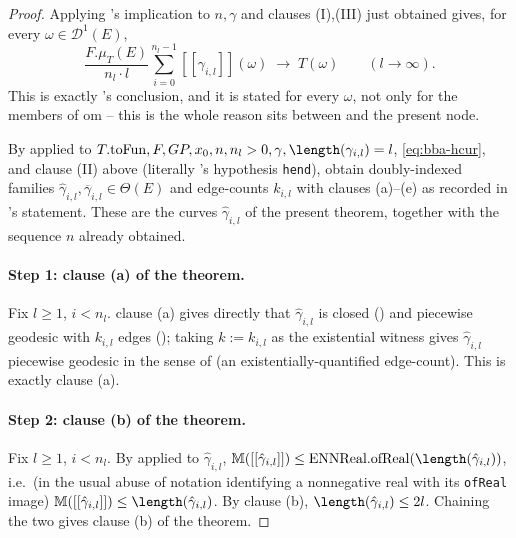\begin{proof}
  Applying 's implication to $n,\gamma$ and clauses (I),(III) just
  obtained gives, for every $\omega\in\mathcal D^1(E)$,
  \begin{equation}\label{eq:bba-hcur}
    \frac{F.\mu_T(E)}{n_l\cdot l}\sum_{i=0}^{n_l-1}[[\gamma_{i,l}]](\omega)
    \;\longrightarrow\; T(\omega)
    \qquad(l\to\infty)
    . \tag{hcur}
  \end{equation}
  This is exactly 's conclusion, and it is stated for every
  $\omega$, not only for the members of $\mathrm{om}$ -- this is the whole reason
   sits between  and the present node.

  By  applied to $T.\mathrm{toFun},F,GP,x_0,n,n_l>0,\gamma,\length(\gamma_{i,l})=l$,
  \eqref{eq:bba-hcur}, and clause (II) above (literally 's hypothesis
  \texttt{hend}), obtain doubly-indexed families $\hat\gamma_{i,l},\overline\gamma_{i,l}\in\Theta(E)$
  and edge-counts $k_{i,l}$ with clauses (a)--(e) as recorded in 's statement.
  These are the curves $\hat\gamma_{i,l}$ of the present theorem, together with the sequence $n$
  already obtained.

  \paragraph{Step 1: clause (a) of the theorem.} Fix $l\ge1$, $i<n_l$.  clause
  (a) gives directly that $\hat\gamma_{i,l}$ is closed () and piecewise
  geodesic with $k_{i,l}$ edges (); taking $k:=k_{i,l}$ as the
  existential witness gives $\hat\gamma_{i,l}$ piecewise geodesic in the sense of
   (an existentially-quantified edge-count). This is exactly clause
  (a).

  \paragraph{Step 2: clause (b) of the theorem.} Fix $l\ge1$, $i<n_l$. By
   applied to $\hat\gamma_{i,l}$,
  $\mathbb M([[\hat\gamma_{i,l}]]) \le \mathrm{ENNReal.ofReal}(\length(\hat\gamma_{i,l}))$, i.e.\
  (in the usual abuse of notation identifying a nonnegative real with its \texttt{ofReal} image)
  $\mathbb M([[\hat\gamma_{i,l}]]) \le \length(\hat\gamma_{i,l})$. By \noderef{ClosingUp} clause
  (b), $\length(\hat\gamma_{i,l}) \le 2l$. Chaining the two gives clause (b) of the theorem.


\end{proof}
